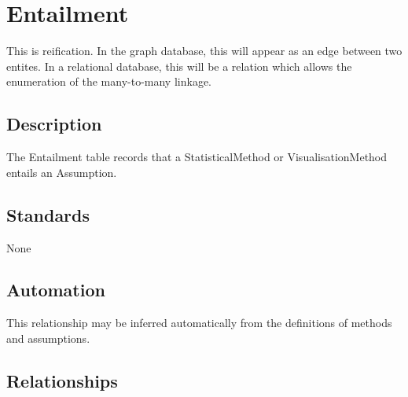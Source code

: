 \section{Entailment}\label{entailment}

This is reification. In the graph database, this will appear as an edge
between two entites. In a relational database, this will be a relation
which allows the enumeration of the many-to-many linkage.

\subsection{Description}\label{description-13}

The Entailment table records that a StatisticalMethod or
VisualisationMethod entails an Assumption.

\subsection{Standards}\label{standards-15}

None

\subsection{Automation}\label{automation-15}

This relationship may be inferred automatically from the definitions of
methods and assumptions.

\subsection{Relationships}\label{relationships-11}

